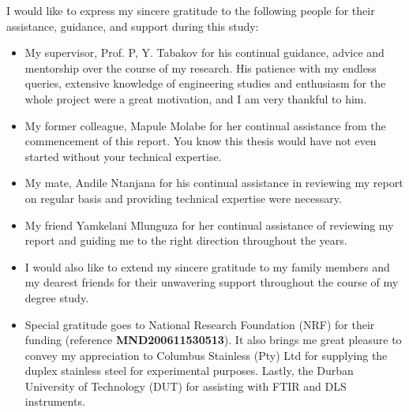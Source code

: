 I would like to express my sincere gratitude to the following people for their assistance, guidance, and support during this study:

\begin{itemize}
    \item My supervisor, Prof. P, Y. Tabakov for his continual guidance, advice and mentorship over the course of my research. His patience with my endless queries, extensive knowledge of engineering studies and enthusiasm for the whole project were a great motivation, and I am very thankful to him.

    \item My former colleague, Mapule Molabe for her continual assistance from the commencement of this report. You know this thesis would have not even started without your technical expertise.    

    \item My mate, Andile Ntanjana for his continual assistance in reviewing my report on regular basis and providing technical expertise were necessary.

    \item My friend Yamkelani Mlunguza for her continual assistance of reviewing my report and guiding me to the right direction throughout the years.

    \item I would also like to extend my sincere gratitude to my family members and my dearest friends for their unwavering support throughout the course of my degree study.

    \item Special gratitude goes to National Research Foundation (NRF) for their funding (reference \textbf{MND200611530513}). It also brings me great pleasure to convey my appreciation to Columbus Stainless (Pty) Ltd for supplying the duplex stainless steel for experimental purposes. Lastly, the Durban University of Technology (DUT) for assisting with FTIR and DLS instruments. 
 \end{itemize}